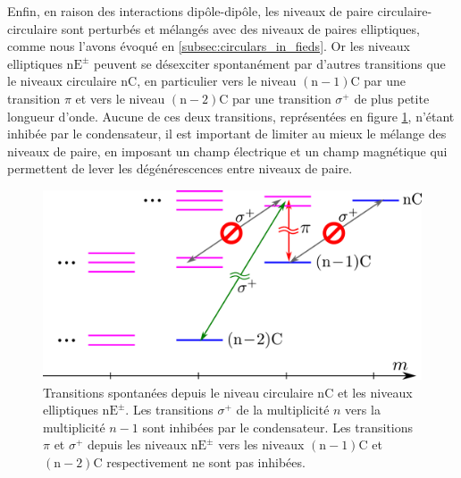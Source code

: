 Enfin, en raison des interactions dipôle-dipôle, les niveaux de paire circulaire-circulaire sont perturbés et mélangés avec des niveaux de paires elliptiques, comme nous l'avons évoqué en \ref{subsec:circulars_in_fieds}.
Or les niveaux elliptiques $\mathrm{nE^{\pm}}$ peuvent se désexciter spontanément par d'autres transitions que le niveaux circulaire $\mathrm{nC}$, en particulier vers le niveau $\mathrm{(n-1)C}$ par une transition $\pi$ et vers le niveau $\mathrm{(n-2)C}$ par une transition $\sigma^+$ de plus petite longueur d'onde.
Aucune de ces deux transitions, représentées en figure \ref{fig:sigma_pi}, n'étant inhibée par le condensateur, il est important de limiter au mieux le mélange des niveaux de paire, en imposant un champ électrique et un champ magnétique qui permettent de lever les dégénérescences entre niveaux de paire.

\begin{figure}[h]
\centering
\includegraphics[width=0.7 \linewidth]{figures/circsim/sigma_pi}
\caption[Transitions spontanées depuis les niveaux elliptiques $\mathrm{nE^\pm}$]{
Transitions spontanées depuis le niveau circulaire $\mathrm{nC}$ et les niveaux elliptiques $\mathrm{nE^\pm}$.
Les transitions $\sigma^+$ de la multiplicité $n$ vers la multiplicité $n-1$ sont inhibées par le condensateur.
Les transitions $\pi$ et $\sigma^+$ depuis les niveaux $\mathrm{nE^\pm}$ vers les niveaux $\mathrm{(n-1)C}$ et $\mathrm{(n-2)C}$ respectivement ne sont pas inhibées.
}
\label{fig:sigma_pi}
\end{figure}

